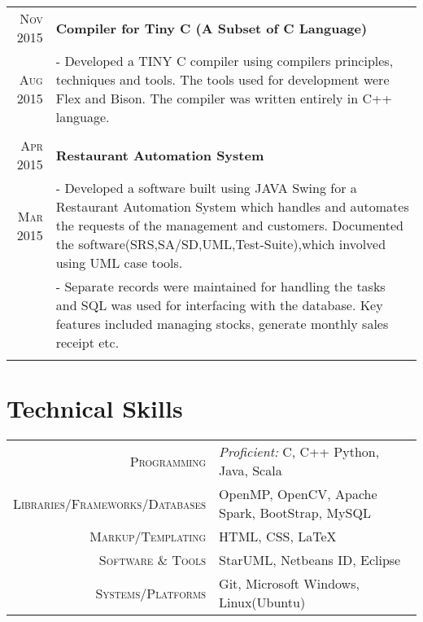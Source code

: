 \documentclass[a4paper,10pt]{extarticle} %
\begin{document}
\begin{tabular}{r|p{16cm}}
\textsc{\normalsize{Nov 2015}} & \textbf{\normalsize{Compiler for Tiny C (A Subset of C Language)}}\\
\textsc {\normalsize{Aug 2015}} & \footnotesize{- Developed a TINY C compiler using compilers principles, techniques and tools. The tools used for development were Flex and Bison. The compiler was written entirely in C++ language.}\\
\multicolumn{2}{c}{} \\

\textsc{\normalsize{Apr 2015}} & \textbf{\normalsize{Restaurant Automation System}}\\
\textsc {\normalsize{Mar 2015}} & \footnotesize{- Developed a software built using JAVA Swing for a Restaurant Automation System which handles and automates the requests of the management and customers. Documented the software(SRS,SA/SD,UML,Test-Suite),which involved using UML case tools.}\\
& \footnotesize{- Separate records were maintained for handling the tasks and SQL was used for interfacing with the database. Key features included managing stocks, generate monthly sales receipt etc.}\\
\multicolumn{2}{c}{} \\
\end{tabular}


\section{\large{Technical Skills}}

\begin{tabular}{r|p{16cm}}
\textsc{\normalsize{Programming}} & {\itshape{\small{Proficient:}}} \small{C, C++}\hspace{6pt}{\itshape{\small{Familiar with:}}} \small{Python, Java, Scala} \\
\textsc{\normalsize{Libraries/Frameworks/Databases}} & \small{OpenMP, OpenCV, Apache Spark, BootStrap, MySQL}\\
\textsc{\normalsize{Markup/Templating}} & \small{HTML, CSS, \LaTeX}\\
\textsc{\normalsize{Software \& Tools}} & \small{StarUML, Netbeans ID, Eclipse}\\
\textsc{\normalsize{Systems/Platforms}} & \small{Git, Microsoft Windows, Linux(Ubuntu)}\\
\end{tabular}
\end{document}
